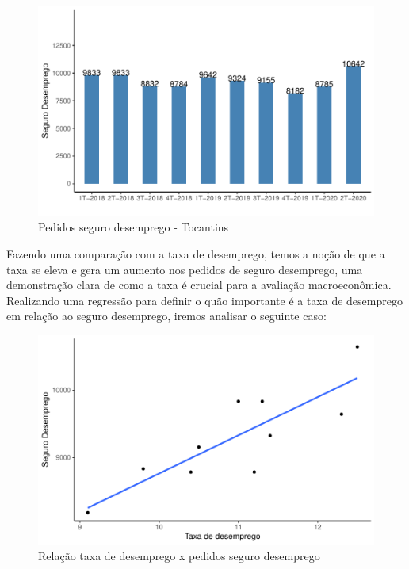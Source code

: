 \begin{figure}[h]
	\caption{Pedidos seguro desemprego - Tocantins}
	\includegraphics[width=\linewidth]{fig/Pedidos seguro desemprego.pdf}
\end{figure}

\par Fazendo uma comparação com a taxa de desemprego, temos a noção de que a taxa se eleva e gera um aumento nos pedidos de seguro desemprego, uma demonstração clara de como a taxa é crucial para a avaliação macroeconômica. Realizando uma regressão para definir o quão importante é a taxa de desemprego em relação ao seguro desemprego, iremos analisar o seguinte caso:

\begin{figure}[h]
	\caption{Relação taxa de desemprego x pedidos seguro desemprego}
	\includegraphics[width=\linewidth]{fig/Relação taxa desemprego x seguro desemprego.pdf}
\end{figure}

